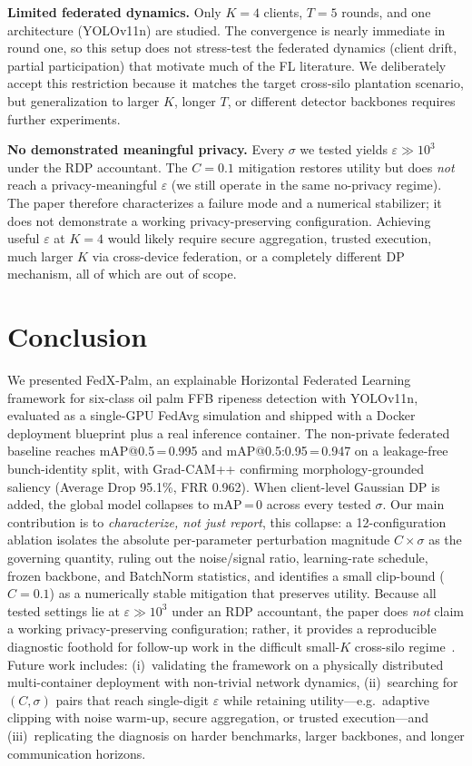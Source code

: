 \documentclass[conference]{IEEEtran}
\begin{document}
\textbf{Limited federated dynamics.} Only $K{=}4$ clients, $T{=}5$ rounds, and
one architecture (YOLOv11n) are studied. The convergence is nearly immediate
in round one, so this setup does not stress-test the federated dynamics
(client drift, partial participation) that motivate much of the FL
literature. We deliberately accept this restriction because it matches the
target cross-silo plantation scenario, but generalization to larger $K$,
longer $T$, or different detector backbones requires further experiments.

\textbf{No demonstrated meaningful privacy.} Every $\sigma$ we tested yields
$\varepsilon \gg 10^{3}$ under the RDP accountant. The $C{=}0.1$ mitigation
restores utility but does \emph{not} reach a privacy-meaningful $\varepsilon$
(we still operate in the same no-privacy regime). The paper therefore
characterizes a failure mode and a numerical stabilizer; it does not
demonstrate a working privacy-preserving configuration. Achieving useful
$\varepsilon$ at $K{=}4$ would likely require secure aggregation, trusted
execution, much larger $K$ via cross-device federation, or a completely
different DP mechanism, all of which are out of scope.

\section{Conclusion}
We presented FedX-Palm, an explainable Horizontal Federated Learning framework
for six-class oil palm FFB ripeness detection with YOLOv11n, evaluated as a
single-GPU FedAvg simulation and shipped with a Docker deployment blueprint
plus a real inference container. The non-private federated baseline reaches
mAP@0.5\,=\,0.995 and mAP@0.5:0.95\,=\,0.947 on a leakage-free bunch-identity
split, with Grad-CAM++ confirming morphology-grounded saliency (Average Drop
95.1\%, FRR 0.962). When client-level Gaussian DP is added, the global model
collapses to mAP\,=\,0 across every tested $\sigma$. Our main contribution is
to \emph{characterize, not just report}, this collapse: a 12-configuration
ablation isolates the absolute per-parameter perturbation magnitude
$C\!\times\!\sigma$ as the governing quantity, ruling out the noise/signal
ratio, learning-rate schedule, frozen backbone, and BatchNorm statistics, and
identifies a small clip-bound ($C{=}0.1$) as a numerically stable mitigation
that preserves utility. Because all tested settings lie at
$\varepsilon\gg10^{3}$ under an RDP accountant, the paper does \emph{not}
claim a working privacy-preserving configuration; rather, it provides a
reproducible diagnostic foothold for follow-up work in the difficult
small-$K$ cross-silo regime~\cite{kairouz2021advances}. Future work includes:
(i)~validating the framework on a physically distributed multi-container
deployment with non-trivial network dynamics, (ii)~searching for
$(C,\sigma)$ pairs that reach single-digit $\varepsilon$ while retaining
utility---e.g.\ adaptive clipping with noise warm-up, secure aggregation, or
trusted execution---and (iii)~replicating the diagnosis on harder
benchmarks, larger backbones, and longer communication horizons.
\end{document}
